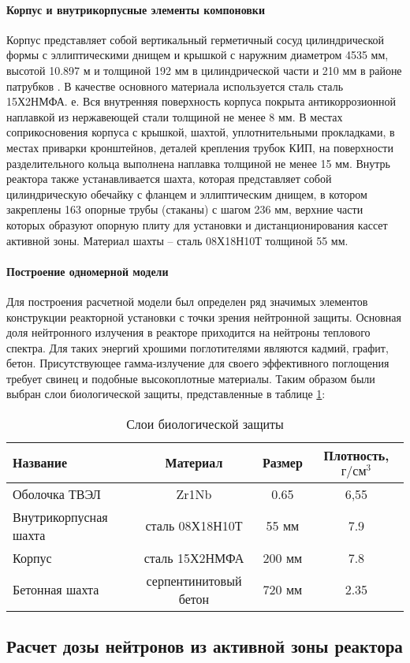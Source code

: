 \paragraph{Корпус и внутрикорпусные элементы компоновки} Корпус представляет собой вертикальный герметичный сосуд
цилиндрической формы с эллиптическими днищем и крышкой  с наружним диаметром 4535 мм, высотой 10.897 м и толщиной 192 мм в цилиндрической части и 210 мм в районе патрубков \cite{лескин2011физические}. В качестве основного материала используется сталь сталь 15Х2НМФА. е. Вся внутренняя поверхность корпуса покрыта
антикоррозионной наплавкой из нержавеющей стали толщиной не
менее 8 мм. В местах соприкосновения корпуса с крышкой, шахтой, уплотнительными прокладками, в местах приварки
кронштейнов, деталей крепления трубок КИП, на поверхности разделительного кольца выполнена наплавка толщиной не менее
15 мм. Внутрь реактора также устанавливается шахта, которая  представляет собой цилиндрическую обечайку с фланцем и эллиптическим днищем, в котором закреплены 163 опорные
трубы (стаканы) с шагом 236 мм, верхние части которых образуют
опорную плиту для установки и дистанционирования кассет активной зоны. Материал шахты – сталь 08Х18Н10Т толщиной 55 мм.

\paragraph{Построение одномерной модели} Для построения расчетной модели был определен ряд значимых элементов конструкции реакторной установки с точки зрения нейтронной защиты. 
Основная доля нейтронного излучения в реакторе приходится на нейтроны теплового спектра. Для таких энергий хрошими поглотителями являются кадмий, графит, бетон. 
Присутствующее гамма-излучение для своего эффективного поглощения требует свинец и подобные высокоплотные материалы. Таким образом были выбран слои биологической защиты, представленные в таблице \ref{tabular:bio-sec-layers}:

\begin{table}[H]
	\caption{Слои биологической защиты}
	\begin{center}
        \begin{tabular}{|l|c|c|c|}
        \toprule
         Название & Материал & Размер & Плотность, $\text{г}/\text{см}^3$ \\ 
         \midrule
         \hline
         Оболочка ТВЭЛ & Zr1Nb & 0.65 & 6,55\\ 
         \hline
         Внутрикорпусная шахта & сталь 08Х18Н10Т & 55 мм & 7.9 \\ 
         \hline
         Корпус & сталь 15Х2НМФА & 200 мм & 7.8 \\ 
         \hline
         Бетонная шахта & серпентинитовый бетон & 720 мм & 2.35 \\ 
         \bottomrule
		\end{tabular}
		\label{tabular:bio-sec-layers}
	\end{center}
\end{table}

\subsection{Расчет дозы нейтронов из активной зоны реактора}
